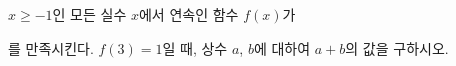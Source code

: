 $x\ge-1$인 모든 실수 $x$에서 연속인 함수 $f(x)$가 \par\smallskip{}\par\smallskip\noindent 를 만족시킨다. $f(3)=1$일 때, 상수 $a$, $b$에 대하여 $a+b$의 값을 구하시오.
